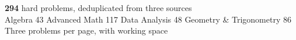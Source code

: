 \textbf{294} hard problems, deduplicated from three sources\\[2pt]Algebra 43 \quad Advanced Math 117 \quad Data Analysis 48 \quad Geometry \& Trigonometry 86\\[2pt]Three problems per page, with working space
